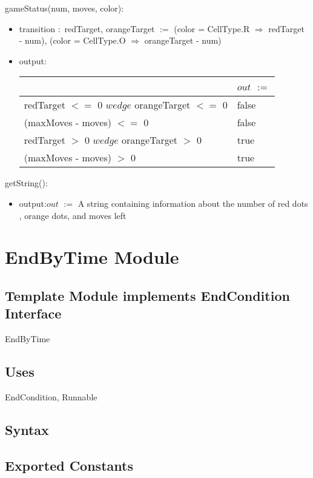 \documentclass[12pt]{article}
\begin{document}
\noindent gameStatus(num, moves, color):

\begin{itemize}
  \item transition $:$
        redTarget, orangeTarget $:=$ (color = CellType.R $\Rightarrow$ redTarget - num), (color = CellType.O $\Rightarrow$ orangeTarget - num)
  \item output:
  \medskip
  \begin{tabular}{| l | l |}
  \hline
  ~ & $out$ $:=$ \\
  \hline
  redTarget $<=$ 0 $wedge$ orangeTarget $<=$ 0 & false \\
  \hline
  (maxMoves - moves) $<=$ 0 & false \\
  \hline
  redTarget $>$ 0 $wedge$ orangeTarget $>$ 0 & true \\
  \hline
  (maxMoves - moves) $>$ 0 & true \\
  \hline
  \end{tabular}
\end{itemize}

\noindent getString():
\begin{itemize}
  \item output:$out$ $:=$ A string containing information about the number of red dots
                          , orange dots, and moves left
\end{itemize}

\newpage

\section* {EndByTime Module}

\subsection* {Template Module implements EndCondition Interface}

EndByTime

\subsection*{Uses}

EndCondition, Runnable

\subsection* {Syntax}

\subsection*{Exported Constants}
\end{document}
